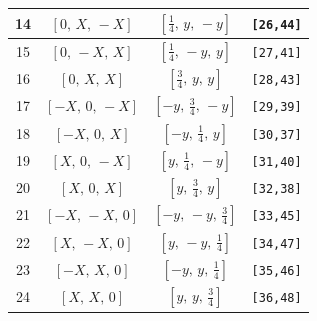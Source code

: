 \documentclass[fleqn,8pt]{jsarticle}
\begin{document}
\begin{longtable}{cccc}
14 & $\left[ 0,\, X,\, - X \right]$ & $\left[ \frac{1}{4},\, y,\, - y \right]$ & {\tt [26,44]} \\ \hline
15 & $\left[ 0,\, - X,\, X \right]$ & $\left[ \frac{1}{4},\, - y,\, y \right]$ & {\tt [27,41]} \\ \hline
16 & $\left[ 0,\, X,\, X \right]$ & $\left[ \frac{3}{4},\, y,\, y \right]$ & {\tt [28,43]} \\ \hline
17 & $\left[ - X,\, 0,\, - X \right]$ & $\left[ - y,\, \frac{3}{4},\, - y \right]$ & {\tt [29,39]} \\ \hline
18 & $\left[ - X,\, 0,\, X \right]$ & $\left[ - y,\, \frac{1}{4},\, y \right]$ & {\tt [30,37]} \\ \hline
19 & $\left[ X,\, 0,\, - X \right]$ & $\left[ y,\, \frac{1}{4},\, - y \right]$ & {\tt [31,40]} \\ \hline
20 & $\left[ X,\, 0,\, X \right]$ & $\left[ y,\, \frac{3}{4},\, y \right]$ & {\tt [32,38]} \\ \hline
21 & $\left[ - X,\, - X,\, 0 \right]$ & $\left[ - y,\, - y,\, \frac{3}{4} \right]$ & {\tt [33,45]} \\ \hline
22 & $\left[ X,\, - X,\, 0 \right]$ & $\left[ y,\, - y,\, \frac{1}{4} \right]$ & {\tt [34,47]} \\ \hline
23 & $\left[ - X,\, X,\, 0 \right]$ & $\left[ - y,\, y,\, \frac{1}{4} \right]$ & {\tt [35,46]} \\ \hline
24 & $\left[ X,\, X,\, 0 \right]$ & $\left[ y,\, y,\, \frac{3}{4} \right]$ & {\tt [36,48]} \\
\end{longtable}
\renewcommand{\arraystretch}{1.2}
\end{document}
